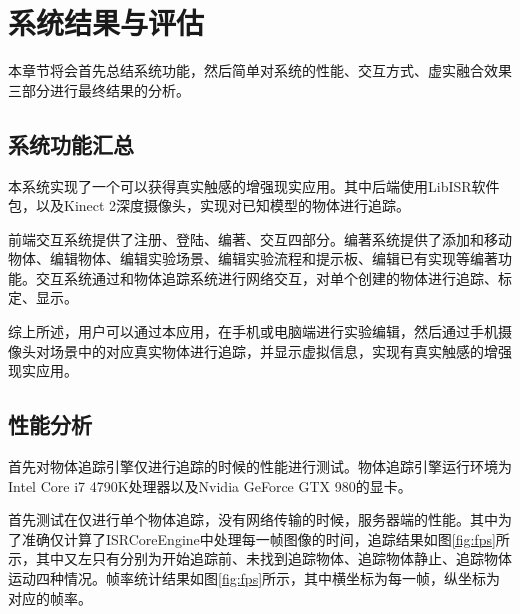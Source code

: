 \chapter{系统结果与评估}
\label{result}

本章节将会首先总结系统功能，然后简单对系统的性能、交互方式、虚实融合效果三部分进行最终结果的分析。

\section{系统功能汇总}
本系统实现了一个可以获得真实触感的增强现实应用。其中后端使用LibISR软件包，以及Kinect 2深度摄像头，实现对已知模型的物体进行追踪。

前端交互系统提供了注册、登陆、编著、交互四部分。编著系统提供了添加和移动物体、编辑物体、编辑实验场景、编辑实验流程和提示板、编辑已有实现等编著功能。交互系统通过和物体追踪系统进行网络交互，对单个创建的物体进行追踪、标定、显示。

综上所述，用户可以通过本应用，在手机或电脑端进行实验编辑，然后通过手机摄像头对场景中的对应真实物体进行追踪，并显示虚拟信息，实现有真实触感的增强现实应用。

\section{性能分析}

首先对物体追踪引擎仅进行追踪的时候的性能进行测试。物体追踪引擎运行环境为Intel Core i7 4790K处理器以及Nvidia GeForce GTX 980的显卡。

首先测试在仅进行单个物体追踪，没有网络传输的时候，服务器端的性能。其中为了准确仅计算了ISRCoreEngine中处理每一帧图像的时间，追踪结果如图\ref{fig:fps}所示，其中又左只有分别为开始追踪前、未找到追踪物体、追踪物体静止、追踪物体运动四种情况。帧率统计结果如图\ref{fig:fps}所示，其中横坐标为每一帧，纵坐标为对应的帧率。

